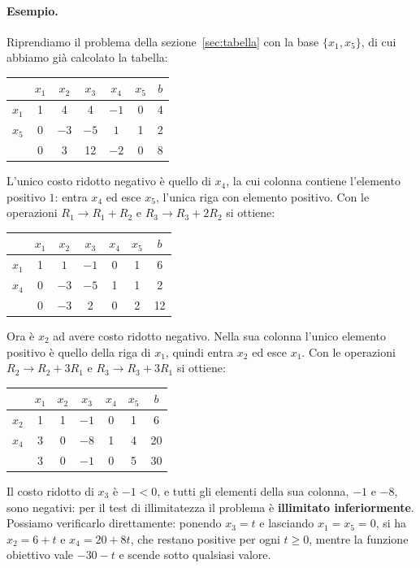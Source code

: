 \paragraph{Esempio.}
Riprendiamo il problema della sezione~\ref{sec:tabella} con la base $\{x_1, x_5\}$, di cui abbiamo già calcolato la tabella:
\begin{center}
\begin{tabular}{c|ccccc|c}
 & $x_1$ & $x_2$ & $x_3$ & $x_4$ & $x_5$ & $b$ \\
\hline
$x_1$ & 1 & 4 & 4 & $-1$ & 0 & 4 \\
$x_5$ & 0 & $-3$ & $-5$ & $\boxed{1}$ & 1 & 2 \\
\hline
 & 0 & 3 & 12 & $-2$ & 0 & 8 \\
\end{tabular}
\end{center}
L'unico costo ridotto negativo è quello di $x_4$, la cui colonna contiene l'elemento positivo $1$: entra $x_4$ ed esce $x_5$, l'unica riga con elemento positivo. Con le operazioni $R_1 \to R_1 + R_2$ e $R_3 \to R_3 + 2R_2$ si ottiene:
\begin{center}
\begin{tabular}{c|ccccc|c}
 & $x_1$ & $x_2$ & $x_3$ & $x_4$ & $x_5$ & $b$ \\
\hline
$x_1$ & 1 & $\boxed{1}$ & $-1$ & 0 & 1 & 6 \\
$x_4$ & 0 & $-3$ & $-5$ & 1 & 1 & 2 \\
\hline
 & 0 & $-3$ & 2 & 0 & 2 & 12 \\
\end{tabular}
\end{center}
Ora è $x_2$ ad avere costo ridotto negativo. Nella sua colonna l'unico elemento positivo è quello della riga di $x_1$, quindi entra $x_2$ ed esce $x_1$. Con le operazioni $R_2 \to R_2 + 3R_1$ e $R_3 \to R_3 + 3R_1$ si ottiene:
\begin{center}
\begin{tabular}{c|ccccc|c}
 & $x_1$ & $x_2$ & $x_3$ & $x_4$ & $x_5$ & $b$ \\
\hline
$x_2$ & 1 & 1 & $-1$ & 0 & 1 & 6 \\
$x_4$ & 3 & 0 & $-8$ & 1 & 4 & 20 \\
\hline
 & 3 & 0 & $-1$ & 0 & 5 & 30 \\
\end{tabular}
\end{center}
Il costo ridotto di $x_3$ è $-1 < 0$, e tutti gli elementi della sua colonna, $-1$ e $-8$, sono negativi: per il test di illimitatezza il problema è \textbf{illimitato inferiormente}. Possiamo verificarlo direttamente: ponendo $x_3 = t$ e lasciando $x_1 = x_5 = 0$, si ha $x_2 = 6 + t$ e $x_4 = 20 + 8t$, che restano positive per ogni $t \ge 0$, mentre la funzione obiettivo vale $-30 - t$ e scende sotto qualsiasi valore.


